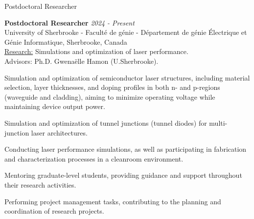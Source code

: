 \documentclass{resume} %
\begin{document}
    \begin{rSection}{Postdoctoral Researcher}

        {\bf Postdoctoral Researcher} \hfill {\em 2024 - Present} \\ 
        {\normalfont University of Sherbrooke - Faculté de génie - Département de génie Électrique et Génie Informatique, Sherbrooke, Canada}\\
        \underline{Research:} {\normalfont Simulations and optimization of laser performance.} \\
        Advisors: Ph.D. Gwenaëlle Hamon (U.Sherbrooke).
        \begin{rSubsection}{}{}{}{}
            {\normalfont 
                \item Simulation and optimization of semiconductor laser structures, including material selection, layer thicknesses, and doping profiles in both n- and p-regions (waveguide and cladding), aiming to minimize operating voltage while maintaining device output power.
                \item Simulation and optimization of tunnel junctions (tunnel diodes) for multi-junction laser architectures.
                \item Conducting laser performance simulations, as well as participating in fabrication and characterization processes in a cleanroom environment.
                \item Mentoring graduate-level students, providing guidance and support throughout their research activities.
                \item Performing project management tasks, contributing to the planning and coordination of research projects.
            }
        \end{rSubsection}


        
        

\end{rSection}
\end{document}

